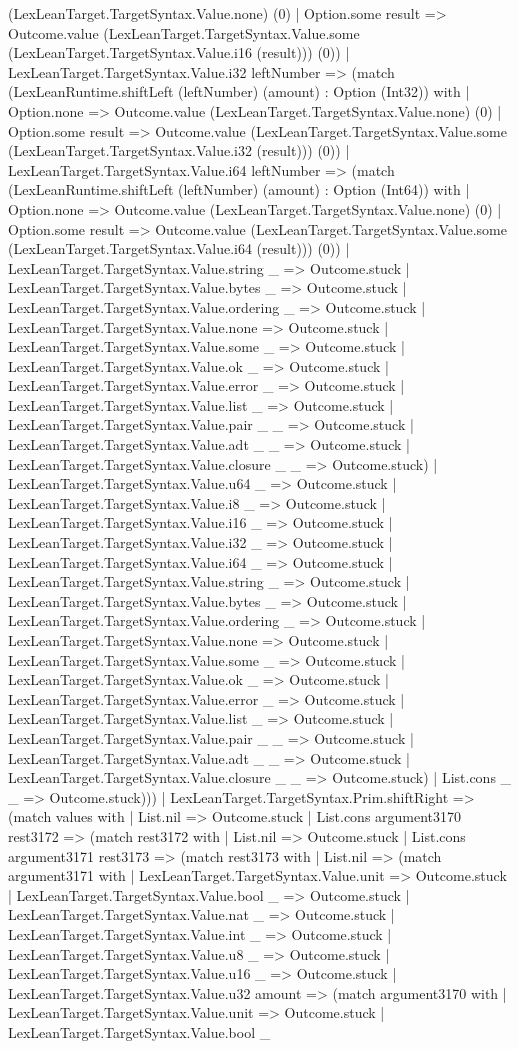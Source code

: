 \documentclass[11pt]{article}
\begin{document}
(LexLeanTarget.TargetSyntax.Value.none) (0) | Option.some result => Outcome.value (LexLeanTarget.TargetSyntax.Value.some (LexLeanTarget.TargetSyntax.Value.i16 (result))) (0)) | LexLeanTarget.TargetSyntax.Value.i32 leftNumber => (match (LexLeanRuntime.shiftLeft (leftNumber) (amount) : Option (Int32)) with | Option.none => Outcome.value (LexLeanTarget.TargetSyntax.Value.none) (0) | Option.some result => Outcome.value (LexLeanTarget.TargetSyntax.Value.some (LexLeanTarget.TargetSyntax.Value.i32 (result))) (0)) | LexLeanTarget.TargetSyntax.Value.i64 leftNumber => (match (LexLeanRuntime.shiftLeft (leftNumber) (amount) : Option (Int64)) with | Option.none => Outcome.value (LexLeanTarget.TargetSyntax.Value.none) (0) | Option.some result => Outcome.value (LexLeanTarget.TargetSyntax.Value.some (LexLeanTarget.TargetSyntax.Value.i64 (result))) (0)) | LexLeanTarget.TargetSyntax.Value.string \_ => Outcome.stuck | LexLeanTarget.TargetSyntax.Value.bytes \_ => Outcome.stuck | LexLeanTarget.TargetSyntax.Value.ordering \_ => Outcome.stuck | LexLeanTarget.TargetSyntax.Value.none => Outcome.stuck | LexLeanTarget.TargetSyntax.Value.some \_ => Outcome.stuck | LexLeanTarget.TargetSyntax.Value.ok \_ => Outcome.stuck | LexLeanTarget.TargetSyntax.Value.error \_ => Outcome.stuck | LexLeanTarget.TargetSyntax.Value.list \_ => Outcome.stuck | LexLeanTarget.TargetSyntax.Value.pair \_ \_ => Outcome.stuck | LexLeanTarget.TargetSyntax.Value.adt \_ \_ => Outcome.stuck | LexLeanTarget.TargetSyntax.Value.closure \_ \_ => Outcome.stuck) | LexLeanTarget.TargetSyntax.Value.u64 \_ => Outcome.stuck | LexLeanTarget.TargetSyntax.Value.i8 \_ => Outcome.stuck | LexLeanTarget.TargetSyntax.Value.i16 \_ => Outcome.stuck | LexLeanTarget.TargetSyntax.Value.i32 \_ => Outcome.stuck | LexLeanTarget.TargetSyntax.Value.i64 \_ => Outcome.stuck | LexLeanTarget.TargetSyntax.Value.string \_ => Outcome.stuck | LexLeanTarget.TargetSyntax.Value.bytes \_ => Outcome.stuck | LexLeanTarget.TargetSyntax.Value.ordering \_ => Outcome.stuck | LexLeanTarget.TargetSyntax.Value.none => Outcome.stuck | LexLeanTarget.TargetSyntax.Value.some \_ => Outcome.stuck | LexLeanTarget.TargetSyntax.Value.ok \_ => Outcome.stuck | LexLeanTarget.TargetSyntax.Value.error \_ => Outcome.stuck | LexLeanTarget.TargetSyntax.Value.list \_ => Outcome.stuck | LexLeanTarget.TargetSyntax.Value.pair \_ \_ => Outcome.stuck | LexLeanTarget.TargetSyntax.Value.adt \_ \_ => Outcome.stuck | LexLeanTarget.TargetSyntax.Value.closure \_ \_ => Outcome.stuck) | List.cons \_ \_ => Outcome.stuck))) | LexLeanTarget.TargetSyntax.Prim.shiftRight => (match values with | List.nil => Outcome.stuck | List.cons argument3170 rest3172 => (match rest3172 with | List.nil => Outcome.stuck | List.cons argument3171 rest3173 => (match rest3173 with | List.nil => (match argument3171 with | LexLeanTarget.TargetSyntax.Value.unit => Outcome.stuck | LexLeanTarget.TargetSyntax.Value.bool \_ => Outcome.stuck | LexLeanTarget.TargetSyntax.Value.nat \_ => Outcome.stuck | LexLeanTarget.TargetSyntax.Value.int \_ => Outcome.stuck | LexLeanTarget.TargetSyntax.Value.u8 \_ => Outcome.stuck | LexLeanTarget.TargetSyntax.Value.u16 \_ => Outcome.stuck | LexLeanTarget.TargetSyntax.Value.u32 amount => (match argument3170 with | LexLeanTarget.TargetSyntax.Value.unit => Outcome.stuck | LexLeanTarget.TargetSyntax.Value.bool \_ 
\end{document}
